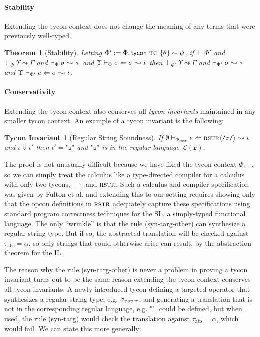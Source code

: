 \documentclass[10pt,preprint]{sigplanconf}
\newtheorem{theorem}{Theorem}
\newtheorem{tyconinvariant}{Tycon Invariant}
\newenvironment{proof-sketch}{\noindent{\emph{Proof Sketch.}}}{\qed}
\begin{document}
\paragraph{Stability}
Extending the tycon context does not change the meaning of any terms that were previously well-typed.
\begin{theorem}[Stability]
Letting $\Phi' := \Phi, {\sf tycon}~\textsc{tc} ~\{\theta\} \sim \psi$, if $\vdash \Phi'$ and $\vdash_\Phi \Upsilon \leadsto \Gamma$ and $\vdash_\Phi \sigma \leadsto \tau$ and $\Upsilon \vdash_{\Phi} e \Leftarrow \sigma \leadsto \iota$ then $\vdash_{\Phi'} \Upsilon \leadsto \Gamma$ and $\vdash_{\Phi'} \sigma \leadsto \tau$ and $\Upsilon \vdash_{\Phi'} e \Leftarrow \sigma \leadsto \iota$.
\end{theorem}

\paragraph{Conservativity} 
Extending the tycon context also conserves all \emph{tycon invariants} maintained in any smaller tycon context. An example of a tycon invariant is the following:

\begin{tyconinvariant}[Regular String Soundness]
If $\emptyset \vdash_{\Phi_\text{rstr}} e \Leftarrow {\textsc{rstr}}\langle\texttt{/r/}\rangle \leadsto \iota$ and $\iota \Downarrow \iota'$ then $\iota'=\texttt{"s"}$ and $\texttt{"s"}$ is in the regular language $\mathcal{L}(\texttt{r})$.
\end{tyconinvariant}
\begin{proof-sketch} The proof is not unusually difficult because we have fixed the tycon context $\Phi_\text{rstr}$, so we can simply treat the calculus like a type-directed compiler for a calculus with only two tycons, $\rightharpoonup$ and $\textsc{rstr}$. Such a calculus and compiler specification was given by Fulton et al. \cite{sanitation-psp14} and extending this to our  setting requires showing only that the opcon definitions in $\textsc{rstr}$ adequately capture these specifications using standard program correctness techniques for the SL, a simply-typed functional language. The only ``wrinkle'' is that the rule (syn-targ-other) can synthesize a regular string type. But if so, the abstracted translation will be checked against $\tau_\text{abs}=\alpha$, so only strings that could otherwise arise can result, by the abstraction theorem for the IL. \end{proof-sketch}

The reason why the rule (syn-targ-other) is never a problem in proving a tycon invariant turns out to be the same reason extending the tycon context conserves all tycon invariants. A newly introduced tycon defining a targeted operator that synthesizes a regular string type, e.g. $\sigma_\text{paper}$, and generating a translation that is not in the corresponding regular language, e.g. $\texttt{""}$, could be defined, but when used, the rule (syn-targ) would check the translation against $\tau_\text{abs}=\alpha$, which would fail. %
 We can state this more generally:
\end{document}
